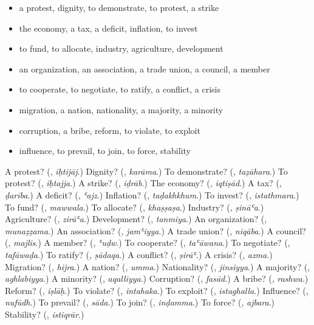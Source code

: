 \begin{itemize}
\raggedright
  \item a protest, dignity, to demonstrate, to protest, a strike
  \item the economy, a tax, a deficit, inflation, to invest
  \item to fund, to allocate, industry, agriculture, development
  \item an organization, an association, a trade union, a council, a member
  \item to cooperate, to negotiate, to ratify, a conflict, a crisis
  \item migration, a nation, nationality, a majority, a minority
  \item corruption, a bribe, reform, to violate, to exploit
  \item influence, to prevail, to join, to force, stability
\end{itemize}

\begin{tcolorbox}[breakable,colback=teal!4,colframe=teal!35!black,title={Before you move on}]
A protest? (\textbf{}, \emph{iḥtijāj}.) Dignity? (\textbf{}, \emph{karāma}.) To demonstrate? (\textbf{}, \emph{taẓāhara}.) To protest? (\textbf{}, \emph{iḥtajja}.) A strike? (\textbf{}, \emph{iḍrāb}.) The economy? (\textbf{}, \emph{iqtiṣād}.) A tax? (\textbf{}, \emph{ḍarība}.) A deficit? (\textbf{}, \emph{ʿajz}.) Inflation? (\textbf{}, \emph{taḍakhkhum}.) To invest? (\textbf{}, \emph{istathmara}.) To fund? (\textbf{}, \emph{mawwala}.) To allocate? (\textbf{}, \emph{khaṣṣaṣa}.) Industry? (\textbf{}, \emph{ṣināʿa}.) Agriculture? (\textbf{}, \emph{zirāʿa}.) Development? (\textbf{}, \emph{tanmiya}.) An organization? (\textbf{}, \emph{munaẓẓama}.) An association? (\textbf{}, \emph{jamʿiyya}.) A trade union? (\textbf{}, \emph{niqāba}.) A council? (\textbf{}, \emph{majlis}.) A member? (\textbf{}, \emph{ʿuḍw}.) To cooperate? (\textbf{}, \emph{taʿāwana}.) To negotiate? (\textbf{}, \emph{tafāwaḍa}.) To ratify? (\textbf{}, \emph{ṣādaqa}.) A conflict? (\textbf{}, \emph{ṣirāʿ}.) A crisis? (\textbf{}, \emph{azma}.) Migration? (\textbf{}, \emph{hijra}.) A nation? (\textbf{}, \emph{umma}.) Nationality? (\textbf{}, \emph{jinsiyya}.) A majority? (\textbf{}, \emph{aghlabiyya}.) A minority? (\textbf{}, \emph{aqalliyya}.) Corruption? (\textbf{}, \emph{fasād}.) A bribe? (\textbf{}, \emph{rashwa}.) Reform? (\textbf{}, \emph{iṣlāḥ}.) To violate? (\textbf{}, \emph{intahaka}.) To exploit? (\textbf{}, \emph{istaghalla}.) Influence? (\textbf{}, \emph{nufūdh}.) To prevail? (\textbf{}, \emph{sāda}.) To join? (\textbf{}, \emph{inḍamma}.) To force? (\textbf{}, \emph{ajbara}.) Stability? (\textbf{}, \emph{istiqrār}.)
\end{tcolorbox}
